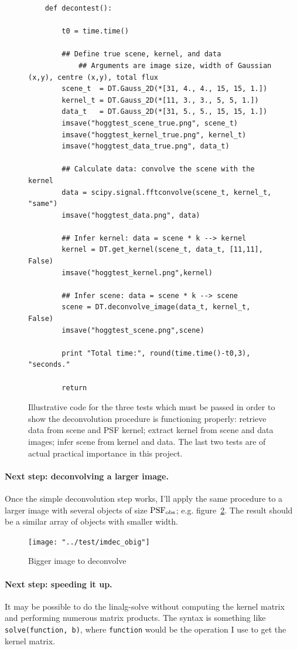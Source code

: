 \documentclass[letterpaper, 11pt]{article}
\def\psfobs{\ensuremath{{\rm PSF_{obs}}}\xspace}
\begin{document}
\begin{figure}
	\begin{verbatim}
	def decontest():
			
		t0 = time.time()
		
		## Define true scene, kernel, and data
			## Arguments are image size, width of Gaussian (x,y), centre (x,y), total flux
		scene_t  = DT.Gauss_2D(*[31, 4., 4., 15, 15, 1.])
		kernel_t = DT.Gauss_2D(*[11, 3., 3., 5, 5, 1.])
		data_t   = DT.Gauss_2D(*[31, 5., 5., 15, 15, 1.])
		imsave("hoggtest_scene_true.png", scene_t)
		imsave("hoggtest_kernel_true.png", kernel_t)
		imsave("hoggtest_data_true.png", data_t)
		
		## Calculate data: convolve the scene with the kernel
		data = scipy.signal.fftconvolve(scene_t, kernel_t, "same")
		imsave("hoggtest_data.png", data)
		
		## Infer kernel: data = scene * k --> kernel
		kernel = DT.get_kernel(scene_t, data_t, [11,11], False)
		imsave("hoggtest_kernel.png",kernel)
		
		## Infer scene: data = scene * k --> scene
		scene = DT.deconvolve_image(data_t, kernel_t, False)
		imsave("hoggtest_scene.png",scene)
		
		print "Total time:", round(time.time()-t0,3), "seconds."
		
		return
	\end{verbatim}
	\caption{Illustrative code for the three tests which must be passed in order to show the deconvolution procedure is functioning properly: retrieve data from scene and PSF kernel; extract kernel from scene and data images; infer scene from kernel and data. The last two tests are of actual practical importance in this project.}
	\label{cde:hoggtest}
\end{figure}

\paragraph{Next step: deconvolving a larger image.} Once the simple deconvolution step works, I'll apply the same procedure to a larger image with several objects of size \psfobs; e.g. figure~\ref{fig:tiled}. The result should be a similar array of objects with smaller width.
\begin{figure}
	\centering
	\texttt{[image: "../test/imdec\_obig"]}
	\caption{Bigger image to deconvolve}
	\label{fig:tiled}
\end{figure}

\paragraph{Next step: speeding it up.} It may be possible to do the linalg-solve without computing the kernel matrix and performing numerous matrix products. The syntax is something like \texttt{solve(function, b)}, where \texttt{function} would be the operation I use to get the kernel matrix.
\end{document}
